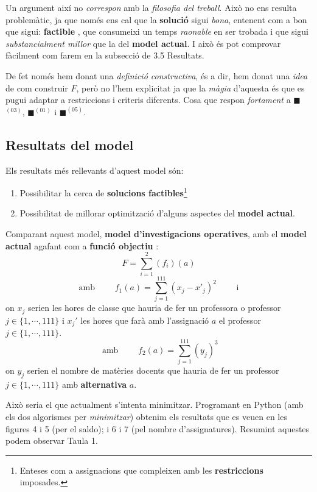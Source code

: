 \documentclass[10pt,twocolumn]{article}
\begin{document}
Un argument així no \textit{correspon} amb la \textit{filosofia del treball}. Això no ens resulta problemàtic, ja que només ens cal que la \textbf{solució} sigui \textit{bona}, entenent com a bon que sigui: \textbf{factible} , que consumeixi un temps \textit{raonable} en ser trobada i que sigui \textit{substancialment millor} que la del \textbf{model actual}. I això és pot comprovar fàcilment com farem en la subsecció de 3.5 Resultats.

De fet només hem donat una \textit{definició constructiva}, és a dir, hem donat una \textit{idea} de com construir $F$, però no l'hem explicitat ja que la \textit{màgia} d'aquesta és que es pugui adaptar a restriccions i criteris diferents. Cosa que respon \textit{fortament} a  {\color{green!60}$\blacksquare$}$^{(03)}$, {\color{cyan!60}$\blacksquare$}$^{(01)}$ i {\color{violet!60}$\blacksquare$}$^{(05)}$.
\subsection{Resultats del model}
Els resultats més rellevants d'aquest model són:
\begin{enumerate}
	\item Possibilitar la cerca de \textbf{solucions factibles}\footnote{Enteses com a assignacions que compleixen amb les \textbf{restriccions} imposades. }
	\item Possibilitat de millorar optimització d'alguns aspectes del \textbf{model actual}.
\end{enumerate}
Comparant aquest model, \textbf{model d'investigacions operatives}, amb el \textbf{model actual} agafant com a \textbf{funció objectiu} :
$$
F=\sum_{i=1}^{2}(f_i)(a) 
$$
$$\text{ amb } \qquad f_1(a)=\sum_{j=1}^{111} (x_j-x'_j)^2 \qquad \text{ i }$$  
on $x_j$ serien les hores de classe que hauria de fer un professora o professor $j \in \{1,\cdots,111\}$ i $x_j'$ les hores que farà amb l'assignació $a$ el professor $j \in \{1,\cdots,111\}$.
$$\text{ amb }  \qquad f_2(a)=\sum_{j=1}^{111} (y_j)^3$$
on $y_j$ serien el nombre de matèries docents que hauria de fer un professor $j \in \{1,\cdots,111\}$   amb \textbf{alternativa} $a$. 

Això seria el que actualment s'intenta minimitzar. Programant en Python (amb els dos algorismes per \textit{minimitzar}) obtenim els resultats que es veuen en les figures 4 i 5 (per el saldo); i 6 i 7 (pel nombre d'assignatures).
Resumint aquestes podem observar Taula 1. 
\vspace{3mm}
\end{document}
